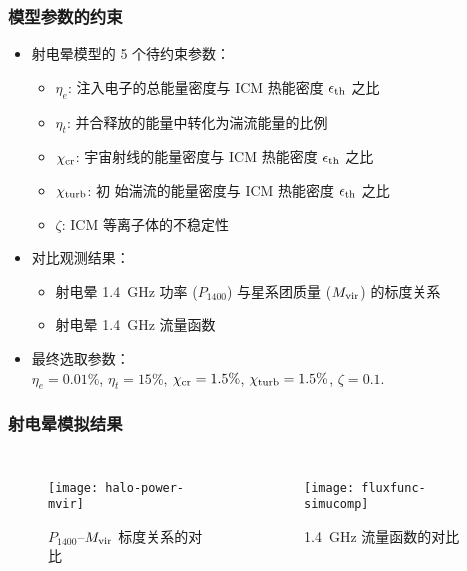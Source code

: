 \documentclass{beamer}
\begin{document}
\begin{frame}[subsec]
  \frametitle{模型参数的约束}
  \begin{itemize}
    \item 射电晕模型的 5 个待约束参数：
      \begin{itemize}
        \item $\eta_e$:
          注入电子的总能量密度与 ICM 热能密度 $\epsilon_{\text{th}}$ 之比
        \item $\eta_t$:
          并合释放的能量中转化为湍流能量的比例
        \item $\chi_{\text{cr}}$:
          宇宙射线的能量密度与 ICM 热能密度 $\epsilon_{\text{th}}$ 之比
        \item $\chi_{\text{turb}}$:
          初  始湍流的能量密度与 ICM 热能密度 $\epsilon_{\text{th}}$ 之比
        \item $\zeta$:
          ICM 等离子体的不稳定性
      \end{itemize}
    \item 对比观测结果：
      \begin{itemize}
        \item 射电晕 \SI{1.4}{\GHz} 功率 ($P_{1400}$)
          与星系团质量 ($M_{\text{vir}}$) 的标度关系
        \item 射电晕 \SI{1.4}{\GHz} 流量函数
      \end{itemize}
    \item 最终选取参数：\\
      $\eta_e = 0.01\%$,
      $\eta_t = 15\%$,
      $\chi_{\text{cr}} = 1.5\%$,
      $\chi_{\text{turb}} = 1.5\%$,
      $\zeta = 0.1$.
  \end{itemize}
\end{frame}

\begin{frame}[subsec]
  \frametitle{射电晕模拟结果}
  \begin{columns}
    \begin{figure}
      \centering
      \texttt{[image: halo-power-mvir]}
      \caption{$P_{1400}$--$M_{\text{vir}}$ 标度关系的对比}
    \end{figure}

    \begin{figure}
      \centering
      \texttt{[image: fluxfunc-simucomp]}
      \caption{\SI{1.4}{\GHz} 流量函数的对比}
    \end{figure}
  \end{columns}
\end{frame}
\end{document}
